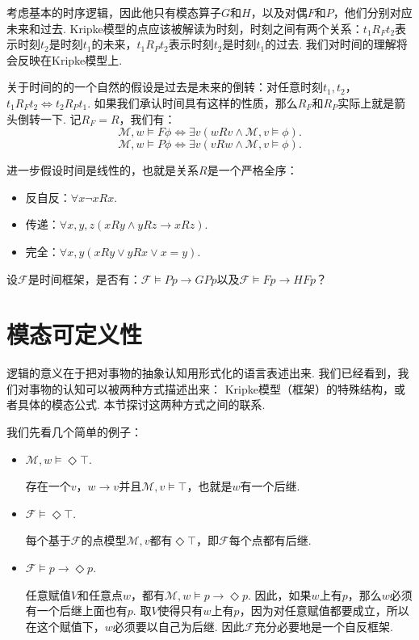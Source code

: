 \begin{example}[时序逻辑]
考虑基本的时序逻辑，因此他只有模态算子$G$和$H$，以及对偶$F$和$P$，他们分别对应未来和过去. Kripke模型的点应该被解读为时刻，时刻之间有两个关系：$t_1 R_F t_2$表示时刻$t_2$是时刻$t_1$的未来，$t_1 R_P t_2$表示时刻$t_2$是时刻$t_1$的过去. 我们对时间的理解将会反映在Kripke模型上.

关于时间的的一个自然的假设是过去是未来的倒转：对任意时刻$t_1,t_2$，$t_1 R_F t_2\iff t_2 R_P t_1$. 如果我们承认时间具有这样的性质，那么$R_F$和$R_P$实际上就是箭头倒转一下. 记$R_F=R$，我们有：
    \[\mathcal M,w\vDash F\phi\iff\exists v(wRv\wedge\mathcal M,v\vDash \phi).\]
    \[\mathcal M,w\vDash P\phi\iff\exists v(vRw\wedge\mathcal M,v\vDash \phi).\]

进一步假设时间是线性的，也就是关系$R$是一个严格全序：
\begin{itemize}
    \item 反自反：$\forall x\neg xRx$.
    \item 传递：$\forall x,y,z(xRy\wedge yRz\to xRz)$.
    \item 完全：$\forall x,y(xRy\vee yRx\vee x=y)$.
\end{itemize}
设$\mathcal F$是时间框架，是否有：$\mathcal F\vDash Pp\to GP p$以及$\mathcal F\vDash Fp\to HF p$？
\end{example}


\section{模态可定义性}

逻辑的意义在于把对事物的抽象认知用形式化的语言表述出来. 我们已经看到，我们对事物的认知可以被两种方式描述出来： Kripke模型（框架）的特殊结构，或者具体的模态公式. 本节探讨这两种方式之间的联系. 

我们先看几个简单的例子：
\begin{example}
\begin{itemize}
    \item $\mathcal M,w\vDash\Diamond\top$.

    存在一个$v$，$w\to v$并且$\mathcal M,v\vDash\top$，也就是$w$有一个后继.

    \item $\mathcal F\vDash\Diamond \top$.
    
    每个基于$\mathcal F$的点模型$\mathcal M,v$都有$\Diamond \top$，即$\mathcal F$每个点都有后继.

    \item $\mathcal F\vDash p\to\Diamond p$.
    
    任意赋值$V$和任意点$w$，都有$\mathcal M,w\vDash p\to\Diamond p$. 因此，如果$w$上有$p$，那么$w$必须有一个后继上面也有$p$. 取$V$使得只有$w$上有$p$，因为对任意赋值都要成立，所以在这个赋值下，$w$必须要以自己为后继. 因此$\mathcal F$充分必要地是一个自反框架.
    \end{itemize}
\end{example}

